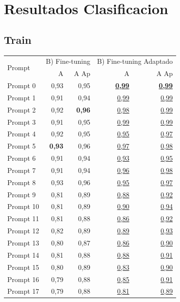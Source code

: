 \section{Resultados Clasificacion}\label{sec:tab_res}
\subsection{Train}\label{sec:tab_res_train}

\begin{table}[H]
\centering
\begin{tabular}{l|rrrr}
\hline
\multirow{2}{*}{Prompt} & \multicolumn{2}{c|}{B) Fine-tuning} & \multicolumn{2}{c|}{B) Fine-tuning Adaptado} \\
 & A & A Ap & A & A Ap \\\hline
Prompt 0 & 0,93 & 0,95 & \uline{\textbf{0,99}} & \uline{\textbf{0,99}} \\
Prompt 1 & 0,91 & 0,94 & \uline{0,99} & \uline{0,99} \\
Prompt 2 & 0,92 & \textbf{0,96} & \uline{0,98} & \uline{0,99} \\
Prompt 3 & 0,91 & 0,95 & \uline{0,99} & \uline{0,99} \\
Prompt 4 & 0,92 & 0,95 & \uline{0,95} & \uline{0,97} \\
Prompt 5 & \textbf{0,93} & 0,96 & \uline{0,97} & \uline{0,98} \\
Prompt 6 & 0,91 & 0,94 & \uline{0,93} & \uline{0,95} \\
Prompt 7 & 0,91 & 0,94 & \uline{0,96} & \uline{0,98} \\
Prompt 8 & 0,93 & 0,96 & \uline{0,95} & \uline{0,97} \\
Prompt 9 & 0,81 & 0,89 & \uline{0,88} & \uline{0,92} \\
Prompt 10 & 0,81 & 0,89 & \uline{0,90} & \uline{0,94} \\
Prompt 11 & 0,81 & 0,88 & \uline{0,86} & \uline{0,92} \\
Prompt 12 & 0,82 & 0,89 & \uline{0,89} & \uline{0,93} \\
Prompt 13 & 0,80 & 0,87 & \uline{0,86} & \uline{0,90} \\
Prompt 14 & 0,81 & 0,88 & \uline{0,88} & \uline{0,91} \\
Prompt 15 & 0,80 & 0,89 & \uline{0,83} & \uline{0,90} \\
Prompt 16 & 0,79 & 0,88 & \uline{0,85} & \uline{0,91} \\
Prompt 17 & 0,79 & 0,88 & \uline{0,81} & \uline{0,89} \\

\end{tabular}
\end{table}
